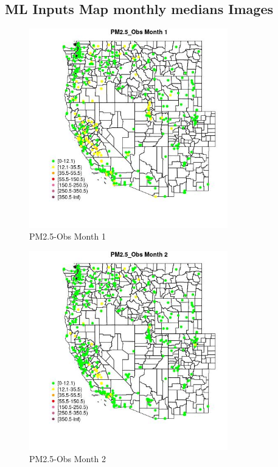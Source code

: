 
\subsection{ML Inputs Map monthly medians Images} 
 

\begin{figure} 
\centering  
\includegraphics[width=0.77\textwidth]{Code_Outputs/ML_input_report_ML_input_PM25_Step5_part_d_de_duplicated_aves_ML_input_MapObsMo1PM25_Obs.jpg} 
\caption{\label{fig:ML_input_report_ML_input_PM25_Step5_part_d_de_duplicated_aves_ML_inputMapObsMo1PM25_Obs}PM2.5-Obs Month 1} 
\end{figure} 
 

\begin{figure} 
\centering  
\includegraphics[width=0.77\textwidth]{Code_Outputs/ML_input_report_ML_input_PM25_Step5_part_d_de_duplicated_aves_ML_input_MapObsMo2PM25_Obs.jpg} 
\caption{\label{fig:ML_input_report_ML_input_PM25_Step5_part_d_de_duplicated_aves_ML_inputMapObsMo2PM25_Obs}PM2.5-Obs Month 2} 
\end{figure} 
 

